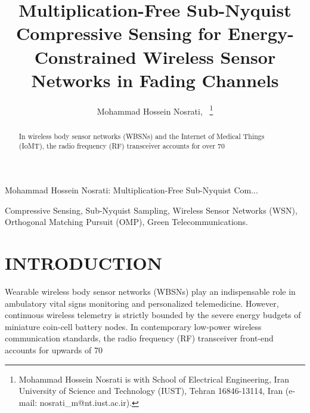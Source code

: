 \documentclass[journal,twocolumn,10pt]{IEEEtran}
\begin{document}
\title{Multiplication-Free Sub-Nyquist Compressive Sensing for Energy-Constrained Wireless Sensor Networks in Fading Channels}

\author{Mohammad Hossein Nosrati,~%
\thanks{Mohammad Hossein Nosrati is with School of Electrical Engineering, Iran University of Science and Technology (IUST), Tehran 16846-13114, Iran (e-mail: nosrati_m@nt.iust.ac.ir).}}

%
{Mohammad Hossein Nosrati: Multiplication-Free Sub-Nyquist Com...}

\maketitle

\begin{abstract}
In wireless body sensor networks (WBSNs) and the Internet of Medical Things (IoMT), the radio frequency (RF) transceiver accounts for over 70%
\end{abstract}

\begin{IEEEkeywords}
Compressive Sensing, Sub-Nyquist Sampling, Wireless Sensor Networks (WSN), Orthogonal Matching Pursuit (OMP), Green Telecommunications.
\end{IEEEkeywords}

\section{INTRODUCTION}
Wearable wireless body sensor networks (WBSNs) play an indispensable role in ambulatory vital signs monitoring and personalized telemedicine. However, continuous wireless telemetry is strictly bounded by the severe energy budgets of miniature coin-cell battery nodes. In contemporary low-power wireless communication standards, the radio frequency (RF) transceiver front-end accounts for upwards of 70%
\end{document}
